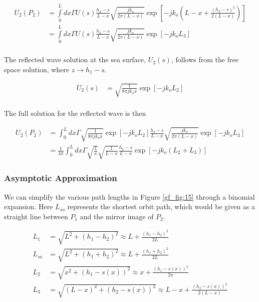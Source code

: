 \begin{equation}
\begin{aligned}
U_2(P_2) &= \int\limits_{0}^{L}dx\Gamma U(s)\frac{h_2-s}{L-x}\sqrt{\frac{jk_o}{2\pi (L-x)}}\exp\left[-jk_o\left(L-x +\frac{(h_2-s)^2}{2(L-x)} \right) \right] \\
&= \int\limits_{0}^{L}dx\Gamma U(s)\frac{h_2-s}{L-x}\sqrt{\frac{jk_o}{2\pi (L-x)}}\exp\left[-jk_oL_3\right] \\
\end{aligned}
\label{gf_eq:56}
\end{equation}
\renewcommand{\baselinestretch}{2} \small\normalsize

The reflected wave solution at the sea surface, $U_2(s)$, follows from the free space solution, where $z \rightarrow h_1-s$.

\begin{equation}
\begin{aligned}
U_2(s) &= \sqrt{\frac{1}{8\pi jk_ox}}\exp\left[-jk_oL_2\right]\\
\end{aligned}
\label{gf_eq:57}
\end{equation}
\renewcommand{\baselinestretch}{2} \small\normalsize

\noindent The full solution for the reflected wave is then 

\begin{equation}
\begin{aligned}
U_2(P_2) &= \int_0^L dx \Gamma \sqrt{\frac{1}{8\pi j k_o x}}\exp[-jk_oL_2]\frac{h_2-s}{L-x}\sqrt{\frac{jk_o}{2\pi(L-x)}}\exp[-jk_oL_3]\\
&= \frac{1}{4\pi}\int_0^L dx \Gamma \sqrt{\frac{1}{x}}\sqrt{\frac{1}{L-x}}\frac{h_2-s}{L-x}\exp\left[-jk_o\left(L_2+L_3\right) \right]
\label{gf_eq:58}
\end{aligned}
\end{equation}
\renewcommand{\baselinestretch}{2} \small\normalsize

\subsubsection{Asymptotic Approximation}
We can simplify the various path lengths in Figure \ref{gf_fig:15} through a binomial expansion. Here $L_{so}$ represents the shortest orbit path, which would be given as a straight line between $P_1$ and the mirror image of $P_2$. 

\begin{equation}
\begin{aligned}
L_1 & = \sqrt{L^2 + (h_1-h_2)^2}  \approx L + \frac{(h_1 - h_2)^2}{2L}\\
L_{so} & = \sqrt{L^2 + (h_1+h_2)^2}  \approx L + \frac{(h_1 + h_2)^2}{2L}\\
L_2 &= \sqrt{x^2 + \left( h_1 - s(x)\right)^2}  \approx x + \frac{(h_1-s(x))^2}{2x}\\
L_3 & = \sqrt{\left(L - x\right)^2 + \left( h_2 - s(x)\right)^2}  \approx L-x + \frac{(h_2 - s(x))^2}{2\left(L-x\right)}\\
\end{aligned}
\label{gf_eq:59}
\end{equation}
\renewcommand{\baselinestretch}{2} \small\normalsize

